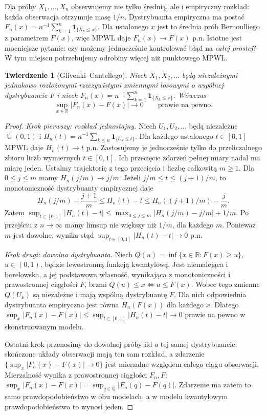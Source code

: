 \documentclass[11pt,a4paper,oneside]{report}
\numberwithin{equation}{chapter}
\theoremstyle{plain}
\newtheorem{twierdzenie}{Twierdzenie}[chapter]
\theoremstyle{definition}
\theoremstyle{remark}
\newcommand{\R}{\mathbb{R}}
\newcommand{\ind}[1]{\mathbf{1}_{#1}}
\newcommand{\Unif}{\operatorname{U}}
\begin{document}
Dla próby $X_1,\ldots,X_n$ obserwujemy nie tylko
średnią, ale i empiryczny rozkład: każda obserwacja
otrzymuje masę $1/n$. Dystrybuanta empiryczna ma
postać
$F_n(x)=n^{-1}\sum_{k=1}^n\ind{\{X_k\leq x\}}$.
Dla ustalonego $x$ jest to średnia prób Bernoulliego
z parametrem $F(x)$, więc MPWL daje
$F_n(x)\to F(x)$ p.n. Istotne jest mocniejsze pytanie:
czy możemy jednocześnie kontrolować błąd
na \emph{całej prostej}? W tym miejscu potrzebujemy
odrobiny więcej niż punktowego MPWL.

\begin{twierdzenie}[Glivenki--Cantellego]
Niech $X_1,X_2,\ldots$ będą niezależnymi
jednakowo rozłożonymi rzeczywistymi zmiennymi losowymi
o wspólnej dystrybuancie $F$ i niech
$F_n(x)=n^{-1}\sum_{k=1}^n\ind{\{X_k\leq x\}}$.
Wówczas
\[
\sup_{x\in\R}|F_n(x)-F(x)|\longrightarrow0
\qquad\text{prawie na pewno}.
\]
\end{twierdzenie}
\begin{proof}
\emph{Krok pierwszy: rozkład jednostajny.}
Niech $U_1,U_2,\ldots$ będą niezależne
$\Unif(0,1)$ i
$H_n(t)=n^{-1}\sum_{k\leq n}\ind{\{U_k\leq t\}}$.
Dla każdego ustalonego $t\in[0,1]$ MPWL
daje $H_n(t)\to t$ p.n. Zastosujemy je
jednocześnie tylko do przeliczalnego zbioru
liczb wymiernych $t\in[0,1]$. Ich przecięcie
zdarzeń pełnej miary nadal ma miarę jeden.
Ustalmy trajektorię z tego przecięcia i
liczbę całkowitą $m\geq1$. Dla
$0\leq j\leq m$ mamy
$H_n(j/m)\to j/m$.
Jeżeli $j/m\leq t\leq(j+1)/m$, to monotoniczność
dystrybuanty empirycznej daje
\[
H_n(j/m)-\frac{j+1}{m}\leq H_n(t)-t
\leq H_n((j+1)/m)-\frac{j}{m}.
\]
Zatem
$\sup_{t\in[0,1]}|H_n(t)-t|\leq
\max_{0\leq j\leq m}|H_n(j/m)-j/m|+1/m$.
Po przejściu z $n\to\infty$ mamy limsup
nie większy niż $1/m$, dla każdego $m$.
Ponieważ $m$ jest dowolne, wynika stąd
$\sup_{t\in[0,1]}|H_n(t)-t|\to0$ p.n.

\emph{Krok drugi: dowolna dystrybuanta.}
Niech $Q(u)=\inf\{x\in\R:F(x)\geq u\}$,
$u\in(0,1)$, będzie lewostronną funkcją kwantylową.
Jest niemalejąca i borelowska, a jej podstawowa
własność, wynikająca z monotoniczności i
prawostronnej ciągłości $F$, brzmi
$Q(u)\leq x\iff u\leq F(x)$.
Wobec tego zmienne $Q(U_k)$ są niezależne i mają
wspólną dystrybuantę $F$. Dla nich odpowiednia
dystrybuanta empiryczna jest równa
$H_n(F(x))$ dla każdego $x$.
Dlatego
$\sup_x|F_n(x)-F(x)|\leq\sup_{t\in[0,1]}|H_n(t)-t|\to0$
prawie na pewno w skonstruowanym modelu.

Ostatni krok przenosimy do dowolnej próby iid o
tej samej dystrybuancie: skończone układy obserwacji
mają ten sam rozkład, a zdarzenie
$\{\sup_x|F_n(x)-F(x)|\to0\}$ jest mierzalne
względem całego ciągu obserwacji. Mierzalność
wynika z prawostronnej ciągłości $F_n,F$:
$\sup_x|F_n(x)-F(x)|=\sup_{q\in\mathbb Q}
|F_n(q)-F(q)|$. Zdarzenie ma zatem to samo
prawdopodobieństwo w obu modelach, a w modelu
kwantylowym prawdopodobieństwo to wynosi jeden.
\end{proof}
\end{document}
